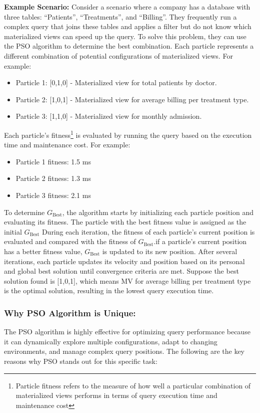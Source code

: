 \textbf{Example Scenario:} Consider a scenario where a company has a database with three tables: ``Patients'', ``Treatments'', and ``Billing''. They frequently run a complex query that joins these tables and applies a filter but do not know which materialized views can speed up the query. To solve this problem, they can use the PSO algorithm to determine the best combination. Each particle represents a different combination of potential configurations of materialized views. For example:

 \begin{itemize}
     \item Particle 1: [0,1,0] - Materialized view for total patients by doctor.
     \item Particle 2: [1,0,1] - Materialized view for average billing per treatment type.
     \item Particle 3: [1,1,0] - Materialized view for monthly admission.
 \end{itemize}

Each particle's fitness\footnote{Particle fitness refers to the measure of how well a particular combination of materialized views performs in terms of query execution time and maintenance cost} is evaluated by running the query based on the execution time and maintenance cost. For example:

\begin{itemize}
     \item Particle 1 fitness: 1.5 ms
     \item Particle 2 fitness: 1.3 ms
     \item Particle 3 fitness: 2.1 ms
 \end{itemize}
 
 To determine $G_{\text{Best}}$, the algorithm starts by initializing each particle position and evaluating its fitness. The particle with the best fitness value is assigned as the initial $G_{\text{Best}}$ During each iteration, the fitness of each particle's current position is evaluated and compared with the fitness of $G_{\text{Best}}$.if a particle's current position has a better fitness value, $G_{\text{Best}}$ is updated to its new position. After several iterations, each particle updates its velocity and position based on its personal and global best solution until convergence criteria are met. Suppose the best solution found is [1,0,1], which means MV for average billing per treatment type is the optimal solution, resulting in the lowest query execution time.

\subsubsection{Why PSO Algorithm is Unique:} The PSO algorithm is highly effective for optimizing query performance because it can dynamically explore multiple configurations, adapt to changing environments, and manage complex query positions. The following are the key reasons why PSO stands out for this specific task:

